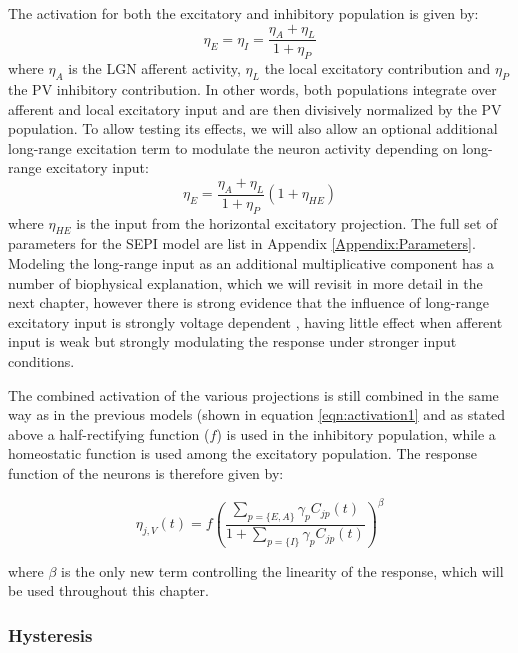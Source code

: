 The activation for both the excitatory and inhibitory population is
given by:
\begin{equation}
  \eta_E = \eta_I = \frac{\eta_{A} + \eta_{L}}{1 + \eta_{P}}
\label{eqn:sepiactivation}
\end{equation}
where $\eta_{A}$ is the LGN afferent activity, $\eta_{L}$ the local
excitatory contribution and $\eta_{P}$ the PV inhibitory
contribution. In other words, both populations integrate over afferent
and local excitatory input and are then divisively normalized by the
PV population. To allow testing its effects, we will also allow an
optional additional long-range excitation term to modulate the neuron
activity depending on long-range excitatory input:
\begin{equation}
  \eta_{E} = \frac{\eta_{A} + \eta_{L}}{1 + \eta_{P}} (1+\eta_{HE})
\end{equation}
where $\eta_{HE}$ is the input from the horizontal excitatory
projection. The full set of parameters for the SEPI model are list in
Appendix \ref{Appendix:Parameters}. Modeling the long-range input as
an additional multiplicative component has a number of biophysical
explanation, which we will revisit in more detail in the next chapter,
however there is strong evidence that the influence of long-range
excitatory input is strongly voltage dependent \citep{Hirsch1991},
having little effect when afferent input is weak but strongly
modulating the response under stronger input conditions.

The combined activation of the various projections is still combined
in the same way as in the previous models (shown in equation
\ref{eqn:activation1} and as stated above a half-rectifying function
($f$) is used in the inhibitory population, while a homeostatic
function is used among the excitatory population. The response
function of the neurons is therefore given by:

\begin{equation}
\eta_{j,V}(t)=f\left(\frac{\sum_{p=\{E, A\}}\gamma_{p}C_{jp}(t)}{1+\sum_{p=\{I\}}\gamma_{p}C_{jp}(t)}\right)^\beta
\label{eqn:activation2}
\end{equation}

where $\beta$ is the only new term controlling the linearity of the
response, which will be used throughout this chapter.

\subsubsection*{Hysteresis}


